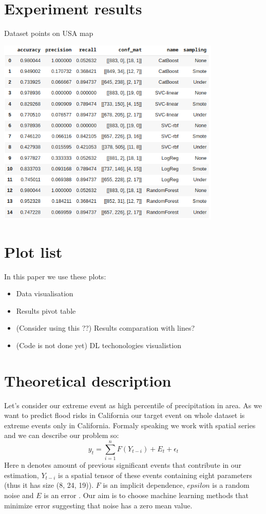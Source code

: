 \documentclass{article}
\begin{document}
\section{Experiment results}
\begin{center}
\caption{Dataset points on USA map}
\includegraphics[width=0.8\textwidth]{pivot_table.png}
\end{center}

\section{Plot list}
In this paper we use these plots: 
\begin{itemize}
    \item Data visualisation
    \item Results pivot table
    \item (Consider using this ??) Results comparation with lines?
    \item (Code is not done yet) DL techonologies visualistion
\end{itemize}

\section{Theoretical description}
Let's consider our extreme event as high percentile of precipitation in area. As we want to predict flood risks in California our target event on whole dataset is extreme events only in California. Formaly speaking we work with spatial series and we can describe our problem so:
$$
y_t = \sum\limits^n_{i=1} F(Y_{t-i}) + E_t +\epsilon_t
$$
Here n denotes amount of previous significant events that contribute in our estimation, $Y_{t-i}$ is a spatial tensor of these events containing eight parameters (thus it has size (8, 24, 19)). $F$ is an implicit dependence, $epsilon$ is a random noise and $E$ is an error . Our aim is to choose machine learning methods that minimize error suggesting that noise has a zero mean value.  
 
\end{document}
